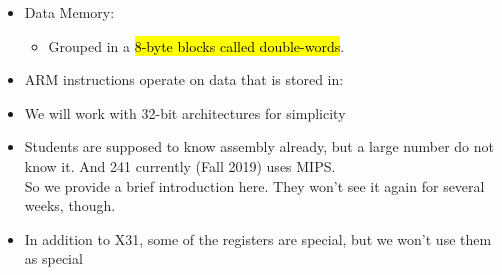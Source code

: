 \begin{frame}[fragile]
\begin{itemize}
\item Data Memory: 
\begin{itemize}
\item Grouped in a \hl{8-byte blocks called double-words}.
 \end{itemize}

 



\end{itemize}



\BNotes\ifnum{}
\begin{itemize}
\item ARM instructions operate on data that is stored in:
\item We will work with 32-bit architectures for simplicity
\item Students are supposed to know assembly already, but a large number
 do not know it.  And 241 currently (Fall 2019) uses MIPS.\\
 So we provide a brief introduction here.
	They won't see it again for several weeks, though.
\item In addition to X31, some of the registers are special, but we
	won't use them as special
\end{itemize}
\fi\ENotes
\end{frame}

